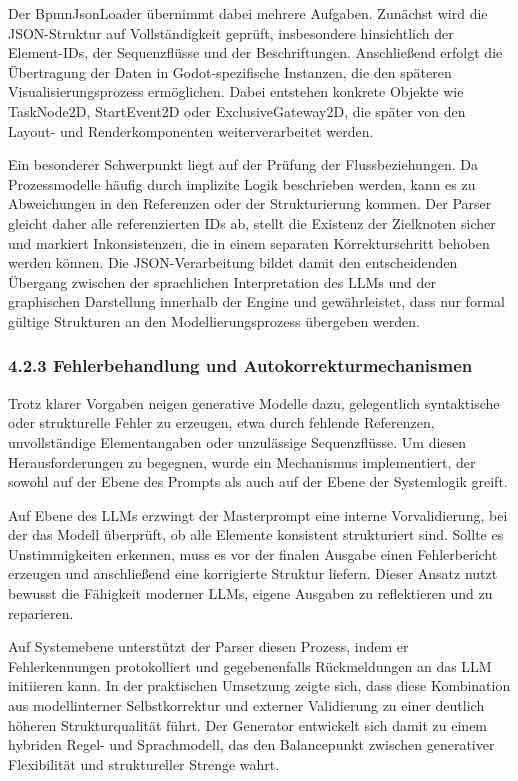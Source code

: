 \documentclass[a4paper,12pt]{scrreprt}
\begin{document}
Der BpmnJsonLoader übernimmt dabei mehrere Aufgaben. Zunächst wird die JSON-Struktur auf Vollständigkeit geprüft, insbesondere hinsichtlich der Element-IDs, der Sequenzflüsse und der Beschriftungen. Anschließend erfolgt die  Übertragung der Daten in Godot-spezifische Instanzen, die den späteren Visualisierungsprozess ermöglichen. Dabei entstehen konkrete Objekte wie TaskNode2D, StartEvent2D oder ExclusiveGateway2D, die später von den Layout- und  Renderkomponenten weiterverarbeitet werden.

Ein besonderer Schwerpunkt liegt auf der Prüfung der Flussbeziehungen. Da Prozessmodelle häufig durch implizite Logik beschrieben werden, kann es zu Abweichungen in den Referenzen oder der Strukturierung kommen. Der Parser gleicht daher alle referenzierten IDs ab, stellt die Existenz der Zielknoten sicher und markiert Inkonsistenzen, die in einem separaten Korrekturschritt behoben werden können. Die JSON-Verarbeitung bildet damit den entscheidenden Übergang zwischen der sprachlichen Interpretation des LLMs und der graphischen Darstellung innerhalb der Engine und gewährleistet, dass nur formal gültige Strukturen an den Modellierungsprozess übergeben werden.

\subsubsection*{4.2.3 Fehlerbehandlung und Autokorrekturmechanismen}

Trotz klarer Vorgaben neigen generative Modelle dazu, gelegentlich syntaktische oder strukturelle Fehler zu erzeugen, etwa durch fehlende Referenzen, unvollständige Elementangaben oder unzulässige Sequenzflüsse. Um diesen Herausforderungen zu begegnen, wurde ein Mechanismus implementiert, der sowohl auf der Ebene des Prompts als auch auf der Ebene der Systemlogik greift.

Auf Ebene des LLMs erzwingt der Masterprompt eine interne Vorvalidierung, bei der das Modell überprüft, ob alle Elemente konsistent strukturiert sind. Sollte es Unstimmigkeiten erkennen, muss es vor der finalen Ausgabe einen Fehlerbericht erzeugen und anschließend eine korrigierte Struktur liefern. Dieser Ansatz nutzt bewusst die Fähigkeit moderner LLMs, eigene Ausgaben zu reflektieren und zu reparieren.

Auf Systemebene unterstützt der Parser diesen Prozess, indem er Fehlerkennungen protokolliert und gegebenenfalls Rückmeldungen an das LLM initiieren kann. In der praktischen Umsetzung zeigte sich, dass diese Kombination aus  modellinterner Selbstkorrektur und externer Validierung zu einer deutlich höheren Strukturqualität führt. Der Generator entwickelt sich damit zu einem hybriden Regel- und Sprachmodell, das den Balancepunkt zwischen generativer Flexibilität und struktureller Strenge wahrt.
\end{document}
